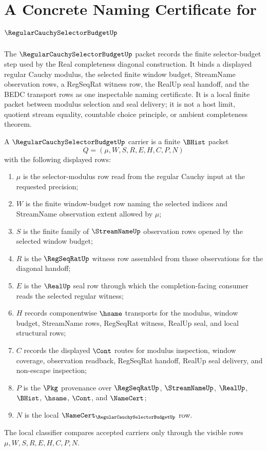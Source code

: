 \chapter{A Concrete Naming Certificate for $\RegularCauchySelectorBudgetUp$}
\label{ch:concrete-instances-regularcauchyselectorbudget-namecert}

The $\RegularCauchySelectorBudgetUp$ packet records the finite selector-budget step used by the Real completeness diagonal construction. It binds a displayed regular Cauchy modulus, the selected finite window budget, StreamName observation rows, a RegSeqRat witness row, the RealUp seal handoff, and the BEDC transport rows as one inspectable naming certificate. It is a local finite packet between modulus selection and seal delivery; it is not a host limit, quotient stream equality, countable choice principle, or ambient completeness theorem.

\begin{definition}
\label{def:regular-cauchy-selector-budget-carrier}
A $\RegularCauchySelectorBudgetUp$ carrier is a finite $\BHist$ packet
$$
Q=(\mu,W,S,R,E,H,C,P,N)
$$
with the following displayed rows:
\begin{enumerate}
\item $\mu$ is the selector-modulus row read from the regular Cauchy input at the requested precision;
\item $W$ is the finite window-budget row naming the selected indices and StreamName observation extent allowed by $\mu$;
\item $S$ is the finite family of $\StreamNameUp$ observation rows opened by the selected window budget;
\item $R$ is the $\RegSeqRatUp$ witness row assembled from those observations for the diagonal handoff;
\item $E$ is the $\RealUp$ seal row through which the completion-facing consumer reads the selected regular witness;
\item $H$ records componentwise $\hsame$ transports for the modulus, window budget, StreamName rows, RegSeqRat witness, RealUp seal, and local structural rows;
\item $C$ records the displayed $\Cont$ routes for modulus inspection, window coverage, observation readback, RegSeqRat handoff, RealUp seal delivery, and non-escape inspection;
\item $P$ is the $\Pkg$ provenance over $\RegSeqRatUp$, $\StreamNameUp$, $\RealUp$, $\BHist$, $\hsame$, $\Cont$, and $\NameCert$;
\item $N$ is the local $\NameCert_{\RegularCauchySelectorBudgetUp}$ row.
\end{enumerate}
The local classifier compares accepted carriers only through the visible rows $\mu,W,S,R,E,H,C,P,N$.
\end{definition}

